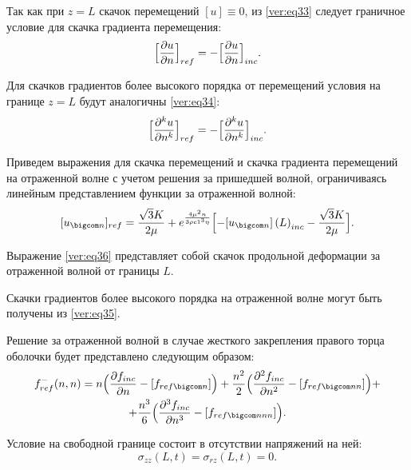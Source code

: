 Так как при $z=L$ скачок перемещений $[u]\equiv0$, из \eqref{ver:eq33} следует граничное условие для скачка градиента перемещения:
\begin{equation}
\label{ver:eq34}
\Bigl[\frac{\partial u}{\partial n}\Bigr]_{ref}=-\Bigl[\frac{\partial u}{\partial n}\Bigr]_{inc}.
\end{equation}

Для скачков градиентов более высокого порядка от перемещений условия на границе  $z=L$ будут аналогичны \eqref{ver:eq34}:
\begin{equation}
\label{ver:eq35}
\Bigl[\frac{\partial^k u}{\partial n^k}\Bigr]_{ref}=-\Bigl[\frac{\partial^k u}{\partial n^k}\Bigr]_{inc}.
\end{equation}

Приведем выражения для скачка перемещений и скачка градиента перемещений на отраженной волне с учетом решения за пришедшей волной, ограничиваясь линейным представлением функции за отраженной волной:
\begin{equation}
\label{ver:eq36}
[u_{\bigcom n}]_{ref}=\frac{\sqrt{3}K}{2\mu}+e^{\frac{4\mu^2 n}{3\rho c1^3 \eta}}\Bigl[-[u_{\bigcom n}]\left(L\right)_{inc}-\frac{\sqrt{3}K}{2\mu}\Bigr].
\end{equation}

Выражение \eqref{ver:eq36} представляет собой скачок продольной деформации за отраженной волной от границы  $L$.

Скачки градиентов более высокого порядка на отраженной волне могут быть получены из \eqref{ver:eq35}.

Решение за отраженной волной в случае жесткого закрепления правого торца оболочки будет представлено следующим образом:
\begin{multline}
\label{ver:eq37}
f^{-}_{ref}(n, n)=n
\Bigl(\frac{\partial f_{inc}}{\partial n}-[f_{ref\bigcom n}]\Bigr)+
\frac{n^2}{2}\Bigl(\frac{\partial^2 f_{inc}}{\partial n^2}-[f_{ref\bigcom nn}]\Bigr)+
\\
+\frac{n^3}{6}\Bigl(\frac{\partial^3 f_{inc}}{\partial n^3}-[f_{ref\bigcom nnn}]\Bigr).
\end{multline}

\smallskip

Условие на свободной границе состоит в отсутствии напряжений на ней:
\begin{equation}
\label{ver:eq38}
\sigma_{zz}(L,t)=\sigma_{rz}(L,t)=0.
\end{equation}

